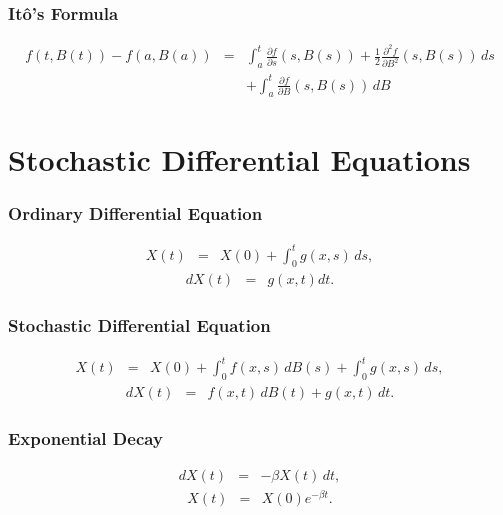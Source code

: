 \documentclass{beamer}   %
\begin{document}
\begin{frame}
    \frametitle{It\^{o}'s Formula}

	\begin{eqnarray}
		f(t, B(t))-f(a, B(a)) &=&\int^t_a \frac{\partial f}{\partial s}(s, B(s)) + \frac{1}{2} 			\frac{\partial^{2} f}{\partial B^{2}}(s, B(s)) \, ds \nonumber \\  
		&&+\int^t_a \frac{\partial f}{\partial B}(s, B(s)) \, dB 
	\end{eqnarray}

\end{frame}








\section[SDE]{Stochastic Differential Equations}

\begin{frame}
    \frametitle{Ordinary Differential Equation}
	\begin{eqnarray*}	
	X(t) &=& X(0) + \int^t_0 g(x,s)\,ds,
	\end{eqnarray*}
	\begin{eqnarray*}
	dX(t)&=&g(x,t)dt. 
	\end{eqnarray*}

\end{frame}

\begin{frame}
    \frametitle{Stochastic Differential Equation}
	\begin{eqnarray*}	
	X(t) &=& X(0) + \int^t_0 f(x,s)\,dB(s) + \int^t_0 g(x,s)\,ds,
	\end{eqnarray*}
	\begin{eqnarray*}
	dX(t)&=&f(x,t)\,dB(t)+g(x,t)\,dt. 
	\end{eqnarray*}

\end{frame}

\begin{frame}
    \frametitle{Exponential Decay}
	\begin{eqnarray*}
		dX(t) &=& -\beta X(t)\,dt,
	\end{eqnarray*}
	\begin{eqnarray*}
		X(t) &=& X(0)e^{-\beta t}.
	\end{eqnarray*}

\end{frame}
\end{document}
